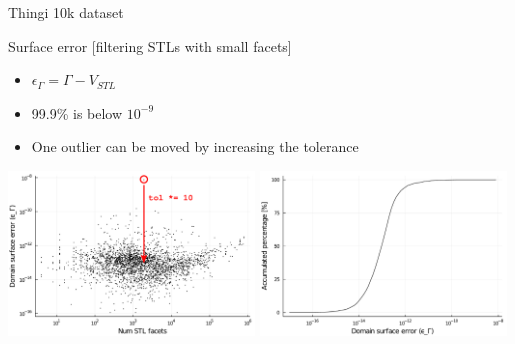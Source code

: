 \documentclass{beamer}
\begin{document}
\begin{frame}{Thingi 10k dataset}

  \begin{block}{Surface error [filtering STLs with small facets]}
  \begin{itemize}
    \item
      $\epsilon_\Gamma = \Gamma - V_{STL}$
    \item
      99.9\% is below $10^{-9}$
    \item
      One outlier can be moved by increasing the tolerance
  \end{itemize}
  \end{block}

  \includegraphics[width=0.49\textwidth]{moving_filter_num_stl_facets_surface_error}
  \includegraphics[width=0.49\textwidth]{../analysis/plots/filter_histogram_surface_error}
\end{frame}
\end{document}
